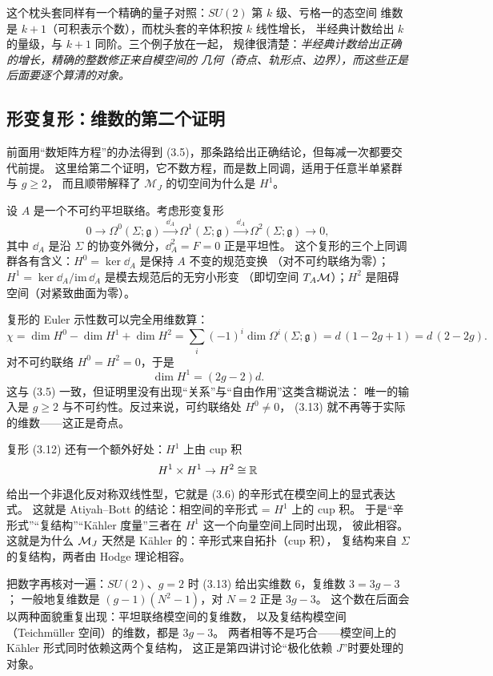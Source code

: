 这个枕头套同样有一个精确的量子对照：$SU(2)$ 第 $k$ 级、亏格一的态空间
维数是 $k+1$（可积表示个数），而枕头套的辛体积按 $k$ 线性增长，
半经典计数给出 $k$ 的量级，与 $k+1$ 同阶。三个例子放在一起，
规律很清楚：\emph{半经典计数给出正确的增长，精确的整数修正来自模空间的
几何（奇点、轨形点、边界），而这些正是后面要逐个算清的对象。}

\subsection{形变复形：维数的第二个证明}

前面用“数矩阵方程”的办法得到 (3.5)，那条路给出正确结论，但每减一次都要交代前提。
这里给第二个证明，它不数方程，而是数上同调，适用于任意半单紧群与 $g\ge2$，
而且顺带解释了 $\mathcal M_J$ 的切空间为什么是 $H^1$。

设 $A$ 是一个不可约平坦联络。考虑形变复形
\begin{equation}
0\longrightarrow \Omega^0(\Sigma;\mathfrak g)\xrightarrow{\ \dd_A\ } \Omega^1(\Sigma;\mathfrak g)
\xrightarrow{\ \dd_A\ }\Omega^2(\Sigma;\mathfrak g)\longrightarrow 0, \tag{3.12}
\end{equation}
其中 $\dd_A$ 是沿 $\Sigma$ 的协变外微分，$\dd_A^2=F=0$ 正是平坦性。
这个复形的三个上同调群各有含义：$H^0=\ker\dd_A$ 是保持 $A$ 不变的规范变换
（对不可约联络为零）；$H^1=\ker\dd_A/\mathrm{im}\,\dd_A$ 是模去规范后的无穷小形变
（即切空间 $T_A\mathcal{M}$）；$H^2$ 是阻碍空间（对紧致曲面为零）。

复形的 Euler 示性数可以完全用维数算：
\[
\chi=\dim H^0-\dim H^1+\dim H^2
=\sum_{i}(-1)^i\dim\Omega^i(\Sigma;\mathfrak g)
=d\,(1-2g+1)=d\,(2-2g).
\]
对不可约联络 $H^0=H^2=0$，于是
\begin{equation}
\dim H^1=(2g-2)d. \tag{3.13}
\end{equation}
这与 (3.5) 一致，但证明里没有出现“关系”与“自由作用”这类含糊说法：
唯一的输入是 $g\ge2$ 与不可约性。反过来说，可约联络处 $H^0\neq0$，
(3.13) 就不再等于实际的维数——这正是奇点。

复形 (3.12) 还有一个额外好处：$H^1$ 上由 cup 积
\[
H^1\times H^1\to H^2\cong\mathbb{R}
\]
给出一个非退化反对称双线性型，它就是 (3.6) 的辛形式在模空间上的显式表达式。
这就是 Atiyah--Bott 的结论：相空间的辛形式 = $H^1$ 上的 cup 积。
于是“辛形式”“复结构”“Kähler 度量”三者在 $H^1$ 这一个向量空间上同时出现，
彼此相容。这就是为什么 $\mathcal{M}_J$ 天然是 Kähler 的：辛形式来自拓扑（cup 积），
复结构来自 $\Sigma$ 的复结构，两者由 Hodge 理论相容。

把数字再核对一遍：$SU(2)$、$g=2$ 时 (3.13) 给出实维数 $6$，复维数 $3=3g-3$；
一般地复维数是 $(g-1)(N^2-1)$，对 $N=2$ 正是 $3g-3$。
这个数在后面会以两种面貌重复出现：平坦联络模空间的复维数，
以及复结构模空间（Teichmüller 空间）的维数，都是 $3g-3$。
两者相等不是巧合——模空间上的 Kähler 形式同时依赖这两个复结构，
这正是第四讲讨论“极化依赖 $J$”时要处理的对象。

